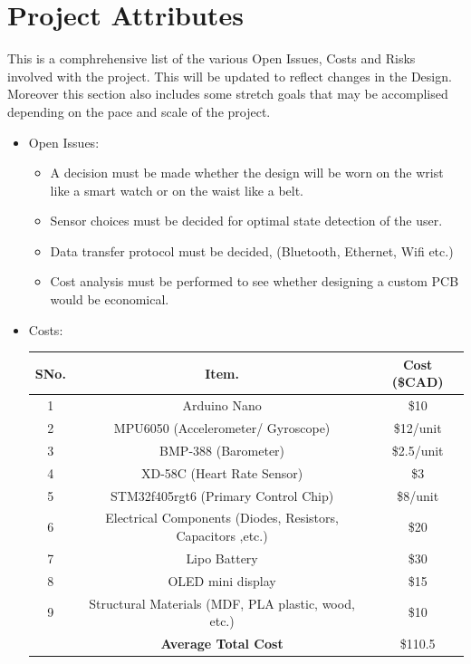 \documentclass[12pt]{article}
\begin{document}
\section{Project Attributes}
This is a comphrehensive list of the various Open Issues, Costs and Risks involved with the project. This will be updated to reflect changes in the Design. Moreover this section also includes some stretch goals that may be accomplised depending on the pace and scale of the project.
\begin{itemize}
\item Open Issues:
	\begin{itemize}
		\item A decision must be made whether the design will be worn on the wrist like a smart watch or on the waist like a belt.
		\item Sensor choices must be decided for optimal state detection of the user.
		\item Data transfer protocol must be decided, (Bluetooth, Ethernet, Wifi etc.)
		\item Cost analysis must be performed to see whether designing a custom PCB would be economical.
	\end{itemize}
	

\item Costs:
		\begin{center}
			\begin{tabular}{ |c|c|c| } 
				 \hline
				 	\textbf{SNo.} &  \textbf{Item.} &  \textbf{Cost (\$CAD)} \\ 
				 \hline
				 	1 & Arduino Nano 											& \$10 \\ 
				 \hline		
				 	2 & MPU6050 (Accelerometer/ Gyroscope)						& \$12/unit \\ 
				 \hline
				 	3 & BMP-388 (Barometer) 									& \$2.5/unit \\ 
				 \hline
				 	4 & XD-58C (Heart Rate Sensor)								& \$3\\ 
				 \hline
				 	5 & STM32f405rgt6 (Primary Control Chip) 						& \$8/unit \\ 
				 \hline
				 	6 & Electrical Components (Diodes, Resistors, Capacitors ,etc.) 		& \$20 \\ 
				 \hline
				 	7 & Lipo Battery 											& \$30 \\ 
				 \hline
				 	8 &OLED mini display										& \$15 \\ 
				 \hline
				 	9 & Structural Materials (MDF, PLA plastic, wood, etc.) 			& \$10 \\ 
				 \hline
				 	& \textbf{Average Total Cost}								& \$110.5 \\ 
				 \hline
			\end{tabular}
		\end{center}


\end{itemize}
\end{document}
